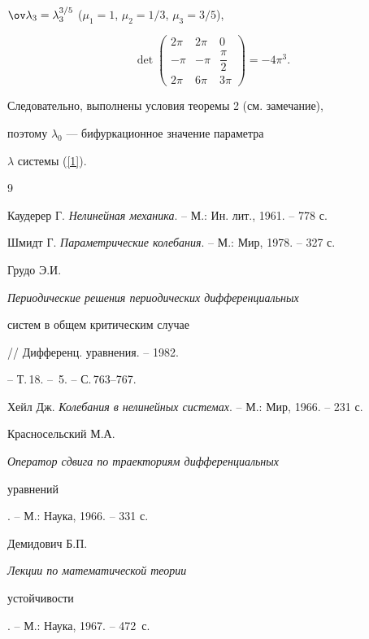 \begin{examnonum}
$\ov \lambda_3 =\lambda_3^{3/5}$ ($\mu_1 =1$, $\mu_2 =1/3$, $\mu_3 =3/5$),


$$


\det


\begin{pmatrix}


{2\pi} & {2\pi} & 0 \\


{- \pi} & {- \pi} & {\dfrac{\pi}{2}} \\


{2\pi} & {6\pi} & {3\pi} 


\end{pmatrix}


= - 4\pi ^3.


$$





Следовательно, выполнены условия теоремы 2 (см. замечание),


поэтому $\lambda_0$ --- бифуркационное значение параметра


$\lambda$ системы (\ref{1}).


\end{examnonum}








\begin{thebibliography}{9}







Каудерер Г. {\em Нелинейная механика}. -- М.: Ин. лит., 1961. -- 778 с.




Шмидт Г. {\em Параметрические колебания}. -- М.: Мир, 1978. -- 327 с.




Грудо Э.И. {\em Периодические решения периодических дифференциальных


систем в общем критическим случае} // Дифференц. уравнения. -- 1982.


-- Т.\,18. -- \No\,5. -- С.\,763--767.




Хейл Дж. {\em Колебания в нелинейных системах}. -- М.: Мир, 1966. -- 231 с.




Красносельский М.А. {\em Оператор сдвига по траекториям дифференциальных 


уравнений}. -- М.: Наука, 1966. -- 331 с.




Демидович Б.П. {\em Лекции по математической теории


устойчивости}. -- М.: Наука, 1967. -- 472~с.





\end{thebibliography}





